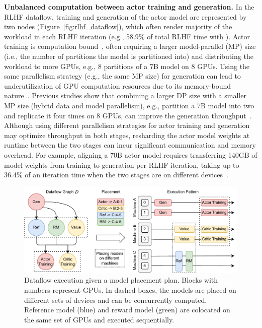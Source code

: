 \noindent\textbf{Unbalanced computation between actor training and generation.} \label{sec:hybrid_motivation}
In the RLHF dataflow, training and generation of the actor model are represented by two nodes (Figure~\ref{fig:rlhf_dataflow}), which often render majority of the workload in each RLHF iteration ({e.g., 58.9\% of total RLHF time with \sysname{}}).
Actor training is computation bound~\cite{geoffrey2021habitat_computebound}, %
often requiring a larger model-parallel (MP) size (i.e., the number of partitions the model is partitioned into) and distributing the workload to more GPUs, e.g., {8 partitions of a 7B model on 8 GPUs.}
Using the same parallelism strategy (e.g., the same MP size) for generation can lead to underutilization of GPU computation resources due to its memory-bound nature~\cite{kwon2023efficient}. 
Previous studies show that combining %
a larger DP size with a smaller MP size (hybrid data and model parallelism), e.g., 
{partition a 7B model into two and replicate it four times on 8 GPUs},
can improve the generation throughput~\cite{li2023alpaserve, zhongDistServeDisaggregatingPrefill2024}. 
Although using different parallelism strategies for actor training and generation may optimize throughput in both stages, resharding the actor model weights at runtime between the two stages can incur significant communication and memory overhead. %
For example, aligning a 70B actor model requires transferring 140GB of model weights from training to generation per RLHF iteration, taking up to 36.4\% of an iteration time when the two stages are on different devices~\cite{hu23openrlhf}.





\begin{figure}[t]
    \includegraphics[width=\linewidth]{figs/fig_placement.pdf}
    \vspace{-5mm}
    \caption{Dataflow execution given a model placement plan. Blocks with numbers represent GPUs. In dashed boxes, the models are placed on different sets of devices and can be concurrently computed. Reference model (blue) and reward model (green) are colocated on the same set of GPUs and executed sequentially.}
    \vspace{-3mm}
    \label{fig:placement}
\end{figure}

